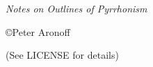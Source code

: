 \begin{titlepage}

\begin{center}

\huge \textit{Notes on \textit{Outlines of Pyrrhonism}}

\vskip2in

\large \copyright Peter Aronoff \the\year

(See LICENSE for details)

\vskip1in

\newpage

\end{center}

\end{titlepage}
